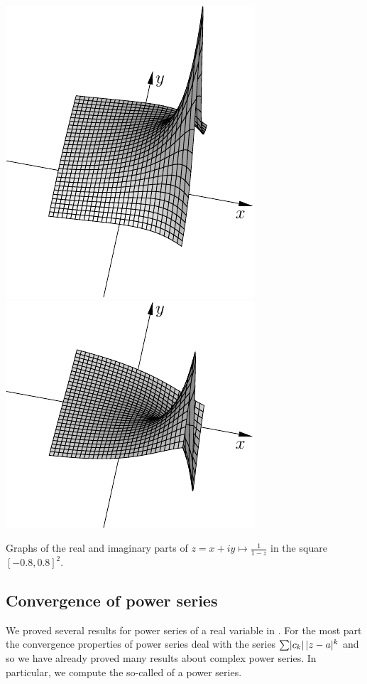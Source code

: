 \begin{myfigureht}
\includegraphics{figures/real1over1mz}
\qquad
\includegraphics{figures/imag1over1mz}
\caption{Graphs of the real and imaginary parts of $z=x+iy \mapsto \frac{1}{1-z}$
in the square $[-0.8,0.8]^2$.\label{fig:1over1mz}}
\end{myfigureht}

\subsection{Convergence of power series}

We proved several results for power series of a real variable in
.   For the most part the convergence
properties of power series deal with the series
$\sum \lvert {c_k} \rvert \, \lvert {z-a} \rvert^k$ and so we have already proved many results about complex power
series.  In particular, we compute the so-called
\emph{} of a power series.

